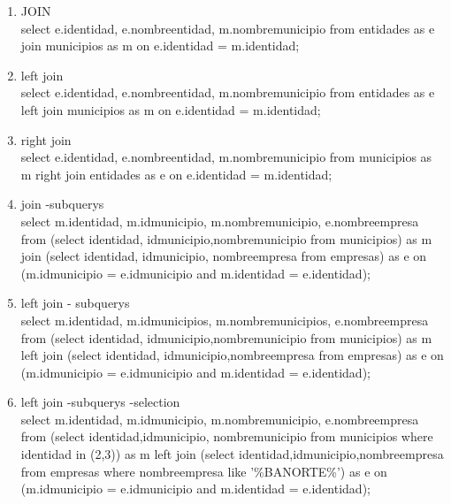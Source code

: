 \documentclass[10pt]{article}         %
\begin{document}
\begin{enumerate}
\item JOIN \\
	select e.identidad, e.nombreentidad, m.nombremunicipio from entidades as e join municipios as m on e.identidad = m.identidad;

\item left join \\
	select e.identidad, e.nombreentidad, m.nombremunicipio from entidades as e left join municipios as m on e.identidad = m.identidad;
	
\item right join \\
	select e.identidad, e.nombreentidad, m.nombremunicipio from municipios as m right join entidades as e on e.identidad = m.identidad;

\item join -subquerys \\
	select m.identidad, m.idmunicipio, m.nombremunicipio, e.nombreempresa from (select identidad, idmunicipio,nombremunicipio from municipios) as m join (select identidad, idmunicipio, nombreempresa from empresas) as e on (m.idmunicipio = e.idmunicipio and m.identidad = e.identidad);

\item left join - subquerys \\

select m.identidad, m.idmunicipios, m.nombremunicipios, e.nombreempresa from (select identidad, idmunicipio,nombremunicipio from municipios) as m left join (select identidad, idmunicipio,nombreempresa from empresas) as e on (m.idmunicipio = e.idmunicipio and m.identidad = e.identidad);

\item left join -subquerys -selection \\

select m.identidad, m.idmunicipio, m.nombremunicipio, e.nombreempresa from (select identidad,idmunicipio, nombremunicipio from municipios where identidad in (2,3)) as m left join (select identidad,idmunicipio,nombreempresa from empresas where nombreempresa like '\%BANORTE\%') as e on (m.idmunicipio = e.idmunicipio and m.identidad = e.identidad);

\end{enumerate}
\end{document}
